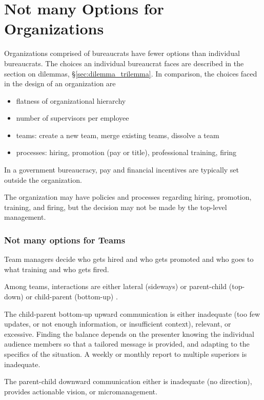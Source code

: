 \section{Not many Options for Organizations}

Organizations comprised of bureaucrats have fewer options than individual bureaucrats. The choices an individual bureaucrat faces are described in the section on dilemmas, \S\ref{sec:dilemma_trilemma}. In comparison, the choices faced in the design of an organization are
\begin{itemize}
    \item flatness of organizational hierarchy
    \item number of supervisors per employee
    \item teams: create a new team, merge existing teams, dissolve a team
    \item processes: hiring, promotion (pay or title), professional training, firing
\end{itemize}
In a government bureaucracy, pay and financial incentives are typically set outside the organization.

The organization may have policies and processes regarding hiring, promotion, training, and firing, but the decision may not be made by the top-level management. 

\subsubsection{Not many options for Teams}

Team managers decide who gets hired and who gets promoted and who goes to what training and who gets fired.

Among teams, interactions are either lateral (sideways) or parent-child (top-down) or child-parent (bottom-up) \cite{2014_Jorgensen}.

The child-parent bottom-up upward communication is either inadequate (too few updates, or not enough information, or insufficient context), relevant, or excessive. Finding the balance depends on the presenter knowing the individual audience members so that a tailored message is provided, and adapting to the specifics of the situation. A weekly or monthly report to multiple superiors is inadequate. 

The parent-child downward communication either is inadequate (no direction), provides actionable vision, or micromanagement. 

